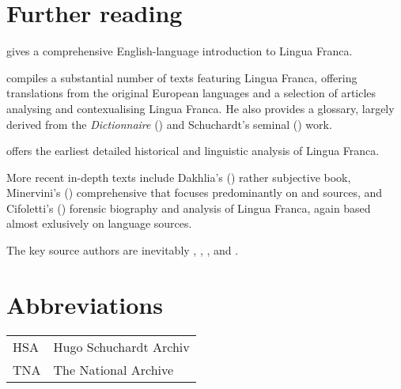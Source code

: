 \documentclass[output=paper]{langsci/langscibook}
\begin{document}
\section*{Further reading}
\begin{furtherreading}
\item[\citet{Nolan2018}]\sloppy gives a comprehensive English-language introduction to Lingua Franca.
\item[\citet{Corré2005}] compiles a substantial number of texts featuring Lingua Franca, offering translations from the original European languages and a selection of articles analysing and contexualising Lingua Franca. He also provides a glossary, largely derived from the \textit{Dictionnaire} (\citeyear{Anonymous1830}) and Schuchardt’s seminal (\citeyear{Schuchardt1909}) work.
\item[\citet{Schuchardt1909}] offers the earliest detailed historical and linguistic analysis of Lingua Franca.  
\item[More recent in-depth texts] include Dakhlia's (\citeyear{Dakhlia2008}) rather subjective book, Minervini's (\citeyear{Minervini1996}) comprehensive  that focuses predominantly on  and  sources, and Cifoletti's (\citeyear{Cifoletti2004}) forensic biography and analysis of Lingua Franca, again based almost exlusively on  language sources.
\item[The key source authors] are inevitably \citet{Haedo1612}, \citet{Broughton1839}, \citet{Pananti1841}, and \citet{Frank1850}.
\end{furtherreading}

\section*{Abbreviations}	

\begin{tabularx}{.5\textwidth}{@{}lQ@{}}
HSA & Hugo Schuchardt Archiv\\
TNA & The National Archive \\ 
\end{tabularx}%

{\sloppy\printbibliography[heading=subbibliography,notkeyword=this]}
\end{document}
